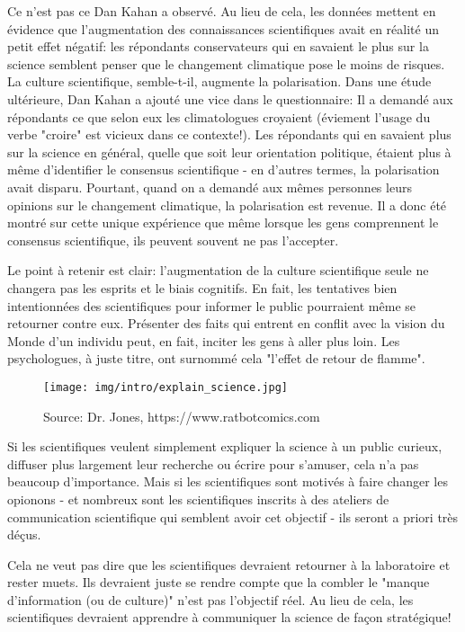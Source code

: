 	Ce n'est pas ce Dan Kahan a observé. Au lieu de cela, les données mettent en évidence que l'augmentation des connaissances scientifiques avait en réalité un petit effet négatif: les répondants conservateurs qui en savaient le plus sur la science semblent penser que le changement climatique pose le moins de risques. La culture scientifique, semble-t-il, augmente la polarisation. Dans une étude ultérieure, Dan Kahan a ajouté une vice dans le questionnaire: Il a demandé aux répondants ce que selon eux les climatologues croyaient (éviement l'usage du verbe "croire" est vicieux dans ce contexte!). Les répondants qui en savaient plus sur la science en général, quelle que soit leur orientation politique, étaient plus à même d'identifier le consensus scientifique - en d'autres termes, la polarisation avait disparu. Pourtant, quand on a demandé aux mêmes personnes leurs opinions sur le changement climatique, la polarisation est revenue. Il a donc été montré sur cette unique expérience que même lorsque les gens comprennent le consensus scientifique, ils peuvent souvent ne pas l'accepter.

	Le point à retenir est clair: l'augmentation de la culture scientifique seule ne changera pas les esprits et le biais cognitifs. En fait, les tentatives bien intentionnées des scientifiques pour informer le public pourraient même se retourner contre eux. Présenter des faits qui entrent en conflit avec la vision du Monde d'un individu peut, en fait, inciter les gens à aller plus loin. Les psychologues, à juste titre, ont surnommé cela "l'effet de retour de flamme".
	\begin{figure}[H]
		\centering
		\texttt{[image: img/intro/explain\_science.jpg]}
		\caption[]{Source: Dr. Jones, https://www.ratbotcomics.com}
	\end{figure}
	Si les scientifiques veulent simplement expliquer la science à un public curieux, diffuser plus largement leur recherche ou écrire pour s'amuser, cela n'a pas beaucoup d'importance. Mais si les scientifiques sont motivés à faire changer les opionons - et nombreux sont les scientifiques inscrits à des ateliers de communication scientifique qui semblent avoir cet objectif - ils seront a priori très déçus.

	Cela ne veut pas dire que les scientifiques devraient retourner à la laboratoire et rester muets. Ils devraient juste se rendre compte que la combler le "manque d'information (ou de culture)" n'est pas l'objectif réel. Au lieu de cela, les scientifiques devraient apprendre à communiquer la science de façon stratégique!

